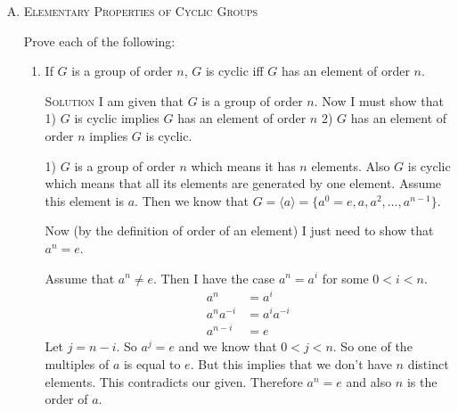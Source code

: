 \documentclass[twoside]{amsart}
\newcommand{\Reals}{\ensuremath{\mathbb{R}}\xspace}
\newcommand{\Integers}{\ensuremath{\mathbb{Z}{}}\xspace}
\newcommand{\solution}{\textsc{Solution}\xspace}
\newcommand{\blank}{\vspace{5pt}}
\newcommand{\ind}{\hspace{.35in}}
\newcommand{\itm}{\blank\item}
\newcommand{\sol}{\blank\noindent\solution}
\begin{document}
\begin{enumerate}[A.]
\begin{enumerate}[1)]
      \itm Is $\Reals^*$ cyclic? Try to prove your answer.

      \sol No it is not cyclic. Assume that it is and $k$ is a
      generator. First we can rule out $k=1$ since $1^n = 1$ for all
      $n$. But now assume that $k > 1$.  Then we have $k < k^2 <
      k^3$. But there are elements of $\Reals^*$ between $k$ and $k^2$
      (Like $(k + k^2)/2$ and infinitely many more).  How are they
      generated?  They can't be generated by $k$. Therefore $k$ is not
      a generator. A similar argument can be used if $k< 1$. But we
      can also use Theorem 1.  If it were cyclic (and obviously of
      order infinity) then it would be isomorphic with
      $\Integers$. But we know the positive reals are not countable,
      therefore there is no isomorphism. And therfore they are not
      cyclic.
   \end{enumerate}

   \itm \textsc{Elementary Properties of Cyclic Groups}

   \noindent Prove each of the following:

   \begin{enumerate}[1)]

      \itm If $G$ is a group of order $n$, $G$ is cyclic iff $G$ has an 
      element of order $n$.

      \sol I am given that $G$ is a group of order $n$. Now I must
      show that 1) $G$ is cyclic implies $G$ has an element of order $n$ 
      2) $G$ has an element of order $n$ implies $G$ is cyclic.

      1) $G$ is a group of order $n$ which means it has $n$ elements. 
      Also $G$ is cyclic which means that all its elements are generated
      by one element. Assume this element is $a$. Then we know that
      $G = \langle a \rangle = \{a^0=e,a,a^2,\ldots,a^{n-1}\}$. 
     

      Now (by the definition of order of an element)
      I just need to show that $a^n = e$.

      \ind Assume that $a^n \ne e$.
      Then I have the case $a^n = a^i$ for some $0 < i < n$.
      \begin{align*}
         a^n &= a^i \\
         a^na^{-i} &= a^ia^{-i} \\
         a^{n-i} &= e
      \end{align*}
      Let $j = n-i$. So $a^j = e$ and we know that $0 < j < n$. So one
      of the multiples of $a$ is equal to $e$. But this implies that
      we don't have $n$ distinct elements. This contradicts our
      given. Therefore $a^n = e$ and also $n$ is the order of $a$.


\end{enumerate}
\end{enumerate}
\end{document}
